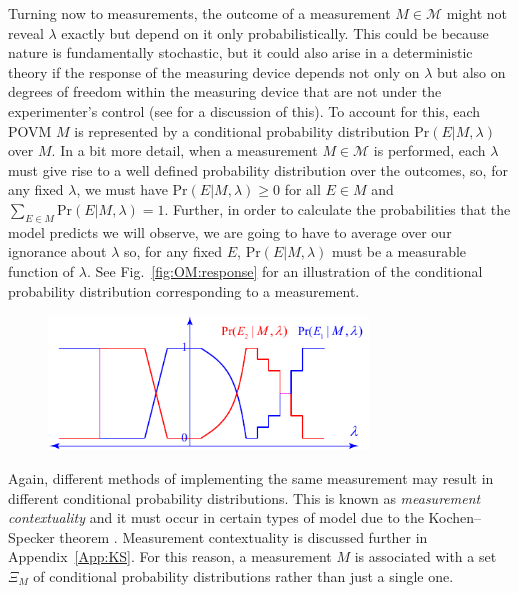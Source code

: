 \documentclass[DIV=calc,paper=a4,fontsize=11pt,twocolumn]{scrartcl} %
\theoremstyle{definition}
\theoremstyle{plain}
\begin{document}
Turning now to measurements, the outcome of a measurement $M \in
\mathcal{M}$ might not reveal $\lambda$ exactly but depend on it only
probabilistically.  This could be because nature is fundamentally
stochastic, but it could also arise in a deterministic theory if the
response of the measuring device depends not only on $\lambda$ but
also on degrees of freedom within the measuring device that are not
under the experimenter's control (see \cite{Harrigan2007} for a
discussion of this).  To account for this, each POVM $M$ is
represented by a conditional probability distribution
$\text{Pr}(E|M,\lambda)$ over $M$.  In a bit more detail, when a
measurement $M \in \mathcal{M}$ is performed, each $\lambda$ must give
rise to a well defined probability distribution over the outcomes, so,
for any fixed $\lambda$, we must have $\text{Pr}(E|M,\lambda) \geq 0$
for all $E \in M$ and $\sum_{E \in M} \text{Pr}(E|M,\lambda) = 1$.
Further, in order to calculate the probabilities that the model
predicts we will observe, we are going to have to average over our
ignorance about $\lambda$ so, for any fixed $E$,
$\text{Pr}(E|M,\lambda)$ must be a measurable function of $\lambda$.
See Fig.~\ref{fig:OM:response} for an illustration of the conditional
probability distribution corresponding to a measurement.
\begin{figure}[t!]
\centering
\includegraphics[width=85mm]{Fig6.pdf}
\caption{}
\end{figure}

Again, different methods of implementing the same measurement may
result in different conditional probability distributions. This is
known as \emph{measurement contextuality} and it must occur in certain
types of model due to the Kochen--Specker theorem \cite{Kochen1967}.
Measurement contextuality is discussed further in
Appendix~\ref{App:KS}.  For this reason, a measurement $M$ is
associated with a set $\Xi_M$ of conditional probability distributions
rather than just a single one.
\end{document}
